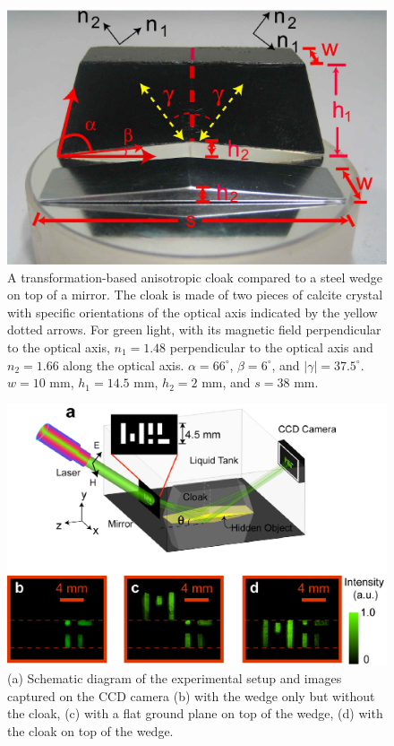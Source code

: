 \documentclass[preprint,preprintnumbers,amsmath,amssymb]{revtex4}
\begin{document}
\begin{figure}
\begin{centering}
\includegraphics[width=1\columnwidth,draft=false]{Fig_2}%
\caption{\label{fig:setup} A transformation-based anisotropic cloak
compared to a steel wedge on top of a mirror. The cloak is made of two
pieces of calcite crystal with specific orientations of the optical
axis indicated by the yellow dotted arrows. For green light, with
its magnetic field perpendicular to the optical axis, $n_1 = 1.48$
perpendicular to the optical axis and $n_2 = 1.66$ along the optical
axis. $\alpha=66^{\circ}$, $\beta = 6^{\circ}$, and $\left|\gamma\right| =
37.5^{\circ}$. $w=10$ mm, $h_1 = 14.5$ mm, $h_2 = 2$ mm, and $s=38$
mm.}
\end{centering}
\end{figure}


\begin{figure}
\begin{centering}
\includegraphics[width=1\columnwidth,draft=false]{Fig_3}%
\caption{\label{fig:green} (a) Schematic diagram of the
experimental setup and images captured on the CCD camera
(b) with the wedge only but
without the cloak, (c) with a flat ground plane on top
of the wedge, (d) with the cloak on top of the wedge. }
\end{centering}
\end{figure}
\end{document}
